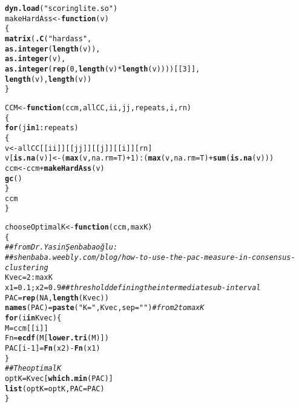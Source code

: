 \documentclass{article}\usepackage[]{graphicx}\usepackage[]{color}
\makeatletter
\newcommand{\hlnum}[1]{\textcolor[rgb]{0.686,0.059,0.569}{#1}}%
\newcommand{\hlstr}[1]{\textcolor[rgb]{0.192,0.494,0.8}{#1}}%
\newcommand{\hlcom}[1]{\textcolor[rgb]{0.678,0.584,0.686}{\textit{#1}}}%
\newcommand{\hlopt}[1]{\textcolor[rgb]{0,0,0}{#1}}%
\newcommand{\hlstd}[1]{\textcolor[rgb]{0.345,0.345,0.345}{#1}}%
\newcommand{\hlkwa}[1]{\textcolor[rgb]{0.161,0.373,0.58}{\textbf{#1}}}%
\newcommand{\hlkwb}[1]{\textcolor[rgb]{0.69,0.353,0.396}{#1}}%
\newcommand{\hlkwc}[1]{\textcolor[rgb]{0.333,0.667,0.333}{#1}}%
\newcommand{\hlkwd}[1]{\textcolor[rgb]{0.737,0.353,0.396}{\textbf{#1}}}%
\newenvironment{kframe}{%
 \def\at@end@of@kframe{}%
 \ifinner\ifhmode%
  \def\at@end@of@kframe{\end{minipage}}%
  \begin{minipage}{\columnwidth}%
 \fi\fi%
 \def\FrameCommand##1{\hskip\@totalleftmargin \hskip-\fboxsep
 \colorbox{shadecolor}{##1}\hskip-\fboxsep
     \hskip-\linewidth \hskip-\@totalleftmargin \hskip\columnwidth}%
 \MakeFramed {\advance\hsize-\width
   \@totalleftmargin\z@ \linewidth\hsize
   \@setminipage}}%
 {\par\unskip\endMakeFramed%
 \at@end@of@kframe}
\newenvironment{knitrout}{}{} %
\makeatother
\begin{document}
\begin{knitrout}\scriptsize
{}\color{fgcolor}\begin{kframe}
\begin{alltt}
\hlkwd{dyn.load}\hlstd{(}\hlstr{"scoringlite.so"}\hlstd{)}
\hlstd{makeHardAss} \hlkwb{<-} \hlkwa{function}\hlstd{(}\hlkwc{v}\hlstd{)}
\hlstd{\{}
    \hlkwd{matrix}\hlstd{(}\hlkwd{.C}\hlstd{(}\hlstr{"hardass"}\hlstd{,}
              \hlkwd{as.integer}\hlstd{(}\hlkwd{length}\hlstd{(v)),}
              \hlkwd{as.integer}\hlstd{(v),}
              \hlkwd{as.integer}\hlstd{(}\hlkwd{rep}\hlstd{(}\hlnum{0}\hlstd{,}\hlkwd{length}\hlstd{(v)}\hlopt{*}\hlkwd{length}\hlstd{(v))))[[}\hlnum{3}\hlstd{]],}
           \hlkwd{length}\hlstd{(v),}\hlkwd{length}\hlstd{(v))}
\hlstd{\}}

\hlstd{CCM} \hlkwb{<-} \hlkwa{function}\hlstd{(}\hlkwc{ccm}\hlstd{,} \hlkwc{allCC}\hlstd{,}\hlkwc{ii}\hlstd{,}\hlkwc{jj}\hlstd{,}\hlkwc{repeats}\hlstd{,}\hlkwc{i}\hlstd{,}\hlkwc{rn}\hlstd{)}
\hlstd{\{}
    \hlkwa{for}\hlstd{(j} \hlkwa{in} \hlnum{1}\hlopt{:}\hlstd{repeats)}
    \hlstd{\{}
        \hlstd{v} \hlkwb{<-} \hlstd{allCC[[ii]][[jj]][[j]][[i]][rn]}
        \hlstd{v[}\hlkwd{is.na}\hlstd{(v)]} \hlkwb{<-} \hlstd{(}\hlkwd{max}\hlstd{(v,}\hlkwc{na.rm}\hlstd{=T)}\hlopt{+}\hlnum{1}\hlstd{)}\hlopt{:}\hlstd{(}\hlkwd{max}\hlstd{(v,}\hlkwc{na.rm}\hlstd{=T)}\hlopt{+}\hlkwd{sum}\hlstd{(}\hlkwd{is.na}\hlstd{(v)))}
        \hlstd{ccm} \hlkwb{<-} \hlstd{ccm}\hlopt{+}\hlkwd{makeHardAss}\hlstd{(v)}
        \hlkwd{gc}\hlstd{()}
    \hlstd{\}}
    \hlstd{ccm}
\hlstd{\}}

\hlstd{chooseOptimalK} \hlkwb{<-} \hlkwa{function}\hlstd{(}\hlkwc{ccm}\hlstd{,}\hlkwc{maxK}\hlstd{)}
\hlstd{\{}
    \hlcom{## from Dr. Yasin Şenbabaoğlu:}
    \hlcom{## shenbaba.weebly.com/blog/how-to-use-the-pac-measure-in-consensus-clustering}
    \hlstd{Kvec} \hlkwb{=} \hlnum{2}\hlopt{:}\hlstd{maxK}
    \hlstd{x1} \hlkwb{=} \hlnum{0.1}\hlstd{; x2} \hlkwb{=} \hlnum{0.9} \hlcom{## threshold defining the intermediate sub-interval}
    \hlstd{PAC} \hlkwb{=} \hlkwd{rep}\hlstd{(}\hlnum{NA}\hlstd{,}\hlkwd{length}\hlstd{(Kvec))}
    \hlkwd{names}\hlstd{(PAC)} \hlkwb{=} \hlkwd{paste}\hlstd{(}\hlstr{"K="}\hlstd{,Kvec,}\hlkwc{sep}\hlstd{=}\hlstr{""}\hlstd{)} \hlcom{# from 2 to maxK}
    \hlkwa{for}\hlstd{(i} \hlkwa{in} \hlstd{Kvec)\{}
        \hlstd{M} \hlkwb{=} \hlstd{ccm[[i]]}
        \hlstd{Fn} \hlkwb{=} \hlkwd{ecdf}\hlstd{(M[}\hlkwd{lower.tri}\hlstd{(M)])}
        \hlstd{PAC[i}\hlopt{-}\hlnum{1}\hlstd{]} \hlkwb{=} \hlkwd{Fn}\hlstd{(x2)} \hlopt{-} \hlkwd{Fn}\hlstd{(x1)}
    \hlstd{\}}
    \hlcom{## The optimal K}
    \hlstd{optK} \hlkwb{=} \hlstd{Kvec[}\hlkwd{which.min}\hlstd{(PAC)]}
    \hlkwd{list}\hlstd{(}\hlkwc{optK}\hlstd{=optK,}\hlkwc{PAC}\hlstd{=PAC)}
\hlstd{\}}


\end{alltt}
\end{kframe}
\end{knitrout}
\end{document}
